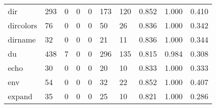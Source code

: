 \begin{longtable}{lp{2.0cm}p{2.0cm}p{2.0cm}p{2.0cm}p{2.0cm}p{2.0cm}p{2.0cm}p{2.0cm}p{2.0cm}}
dir       &                    293 &                                             0 &                                            0 &                                           0 &                                          173 &                                        120 &                                0.852 &                                  1.000 &                                0.410 \\
dircolors &                     76 &                                             0 &                                            0 &                                           0 &                                           50 &                                         26 &                                0.836 &                                  1.000 &                                0.342 \\
dirname   &                     32 &                                             0 &                                            0 &                                           0 &                                           21 &                                         11 &                                0.836 &                                  1.000 &                                0.344 \\
du        &                    438 &                                             7 &                                            0 &                                           0 &                                          296 &                                        135 &                                0.815 &                                  0.984 &                                0.308 \\
echo      &                     30 &                                             0 &                                            0 &                                           0 &                                           20 &                                         10 &                                0.833 &                                  1.000 &                                0.333 \\
env       &                     54 &                                             0 &                                            0 &                                           0 &                                           32 &                                         22 &                                0.852 &                                  1.000 &                                0.407 \\
expand    &                     35 &                                             0 &                                            0 &                                           0 &                                           25 &                                         10 &                                0.821 &                                  1.000 &                                0.286 \\

\end{longtable}
